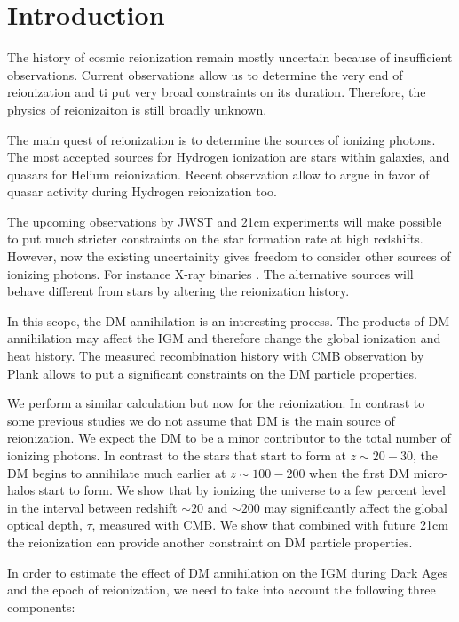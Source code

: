 \section{Introduction}

The history of cosmic reionization remain mostly uncertain because of insufficient observations. Current observations allow us to determine the very end of reionization and ti put very broad constraints on its duration. Therefore, the physics of reionizaiton is still broadly unknown.

The main quest of reionization is to determine the sources of ionizing photons. The most accepted sources for Hydrogen ionization are stars within galaxies, and quasars for Helium reionization. Recent observation allow \cite{2015arXiv150707678M} to argue in favor of quasar activity during Hydrogen reionization too.

The upcoming observations by JWST and 21cm experiments will make possible to put much stricter constraints on the star formation rate at high redshifts. However, now the existing uncertainity gives freedom to consider other sources of ionizing photons. For instance X-ray binaries \cite{Fialkov_2014}. The alternative sources will behave different from stars by altering the reionization history. 

In this scope, the DM annihilation is an interesting process. The products of DM annihilation may affect the IGM and therefore change the global ionization and heat history. The measured recombination history with CMB observation by Plank allows \cite{2015arXiv150603811S} to put a significant constraints on the DM particle properties.

We perform a similar calculation but now for the reionization. In contrast to some previous studies \cite{2009JCAP...10..009C, 2009PhRvD..80c5007B} we do not assume that DM is the main source of reionization. We expect the DM to be a minor contributor to the total number of ionizing photons. In contrast to the stars that start to form at $z\sim 20-30$, the DM begins to annihilate much earlier at $z\sim100-200$ when the first DM micro-halos start to form. We show that by ionizing the universe to a few percent level in the interval between redshift $\sim20$ and $\sim200$ may significantly affect the global optical depth, $\tau$, measured with CMB. We show that combined with future 21cm the reionization can provide another constraint on DM particle properties.

In order to estimate the effect of DM annihilation on the IGM during Dark Ages and the epoch of reionization, we need to take into account the following three components:

